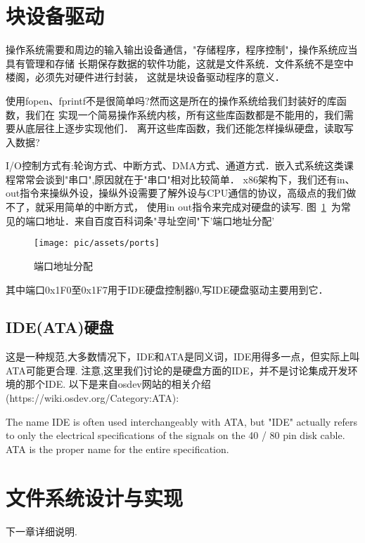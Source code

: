 \section{块设备驱动}
操作系统需要和周边的输入输出设备通信，"存储程序，程序控制"，操作系统应当具有管理和存储
长期保存数据的软件功能，这就是文件系统．文件系统不是空中楼阁，必须先对硬件进行封装，
这就是块设备驱动程序的意义．

使用fopen、fprintf不是很简单吗?然而这是所在的操作系统给我们封装好的库函数，我们在
实现一个简易操作系统内核，所有这些库函数都是不能用的，我们需要从底层往上逐步实现他们．
离开这些库函数，我们还能怎样操纵硬盘，读取写入数据?

I/O控制方式有:轮询方式、中断方式、DMA方式、通道方式．嵌入式系统这类课程常常会谈到"串口",原因就在于"串口"相对比较简单．
x86架构下，我们还有in、out指令来操纵外设，操纵外设需要了解外设与CPU通信的协议，高级点的我们做不了，就采用简单的中断方式，
使用in out指令来完成对硬盘的读写.
图~\ref{ports}~为常见的端口地址．来自百度百科词条"寻址空间"下'端口地址分配'
\begin{figure}[!htbp]
    \centering	\texttt{[image: pic/assets/ports]}
    \caption{端口地址分配}	\label{ports}	\end{figure}

其中端口0x1F0至0x1F7用于IDE硬盘控制器0,写IDE硬盘驱动主要用到它．

\subsection{IDE(ATA)硬盘}
这是一种规范,大多数情况下，IDE和ATA是同义词，IDE用得多一点，但实际上叫ATA可能更合理.
注意,这里我们讨论的是硬盘方面的IDE，并不是讨论集成开发环境的那个IDE.
以下是来自osdev网站的相关介绍(https://wiki.osdev.org/Category:ATA):

The name IDE is often used interchangeably with ATA, but "IDE" actually refers to only the 
electrical specifications of the signals on the 40 / 80 pin disk cable. ATA is the proper 
name for the entire specification.


\section{文件系统设计与实现}
下一章详细说明.





